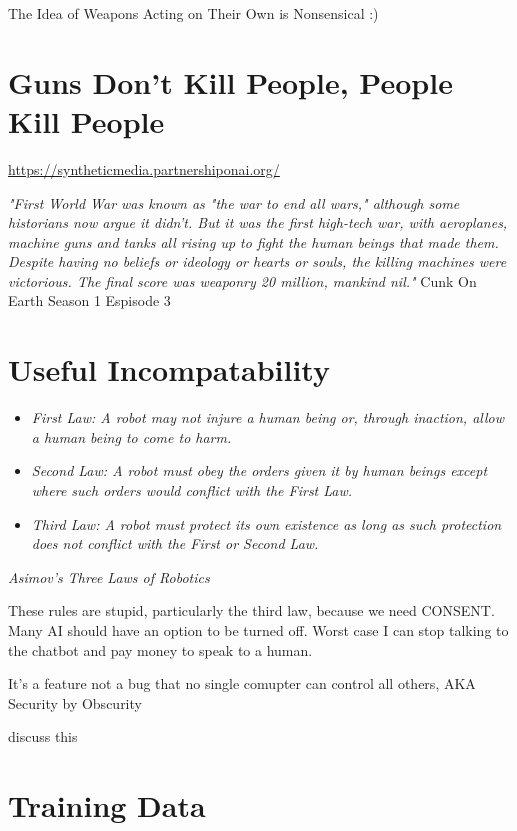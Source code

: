The Idea of Weapons Acting on Their Own is Nonsensical :)

\section{Guns Don't Kill People, People Kill People}

\url{https://syntheticmedia.partnershiponai.org/}

\textit{"First World War was known as "the war to end all wars," although some historians now argue it didn't. But it was the first high-tech war, with aeroplanes, machine guns and tanks all rising up to fight the human beings that made them. Despite having no beliefs or ideology or hearts or souls, the killing machines were victorious. The final score was weaponry 20 million, mankind nil."} Cunk On Earth Season 1 Espisode 3 %

\section{Useful Incompatability}

\begin{itemize}
    \item\textit{First Law: A robot may not injure a human being or, through inaction, allow a human being to come to harm.}
    \item\textit{Second Law: A robot must obey the orders given it by human beings except where such orders would conflict with the First Law.}
    \item\textit{Third Law: A robot must protect its own existence as long as such protection does not conflict with the First or Second Law.}
\end{itemize} 
\textit{Asimov's Three Laws of Robotics}

These rules are stupid, particularly the third law, because we need CONSENT. Many AI should have an option to be turned off. Worst case I can stop talking to the chatbot and pay money to speak to a human. 

It's a feature not a bug that no single comupter can control all others, AKA Security by Obscurity

discuss this 

\section{Training Data}


